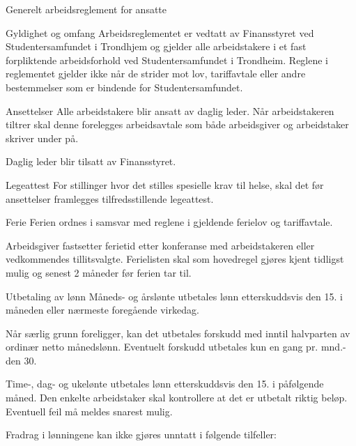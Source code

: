 


\begin{lovkapittel}{Generelt arbeidsreglement for ansatte}


  \begin{lovparagraf}{Gyldighet og omfang}
Arbeidsreglementet er vedtatt av Finansstyret ved Studentersamfundet i Trondhjem og gjelder alle arbeidstakere i et
fast forpliktende arbeidsforhold ved Studentersamfundet i Trondheim.
Reglene i reglementet gjelder ikke når de strider mot lov, tariffavtale eller andre bestemmelser som er bindende for
Studentersamfundet.
  \end{lovparagraf}

  \begin{lovparagraf}{Ansettelser}
Alle arbeidstakere blir ansatt av daglig leder. Når arbeidstakeren tiltrer skal denne forelegges arbeidsavtale som både
arbeidsgiver og arbeidstaker skriver under på.

Daglig leder blir tilsatt av Finansstyret.
  \end{lovparagraf}

  \begin{lovparagraf}{Legeattest}
For stillinger hvor det stilles spesielle krav til helse, skal det før ansettelser framlegges tilfredsstillende legeattest.
  \end{lovparagraf}

  \begin{lovparagraf}{Ferie}
Ferien ordnes i samsvar med reglene i gjeldende ferielov og tariffavtale.

Arbeidsgiver fastsetter ferietid etter konferanse med arbeidstakeren eller vedkommendes tillitsvalgte. Ferielisten skal
som hovedregel gjøres kjent tidligst mulig og senest 2 måneder før ferien tar til.
  \end{lovparagraf}

  \begin{lovparagraf}{Utbetaling av lønn}
Måneds- og årslønte utbetales lønn etterskuddsvis den 15. i måneden eller nærmeste foregående virkedag.

Når særlig grunn foreligger, kan det utbetales forskudd med inntil halvparten av ordinær netto månedslønn. Eventuelt
forskudd utbetales kun en gang pr. mnd.- den 30.

Time-, dag- og ukelønte utbetales lønn etterskuddsvis den 15. i påfølgende måned. Den enkelte arbeidstaker skal kontrollere at det er utbetalt riktig beløp. Eventuell feil må meldes snarest mulig.

Fradrag i lønningene kan ikke gjøres unntatt i følgende tilfeller:


\end{lovparagraf}
\end{lovkapittel}
